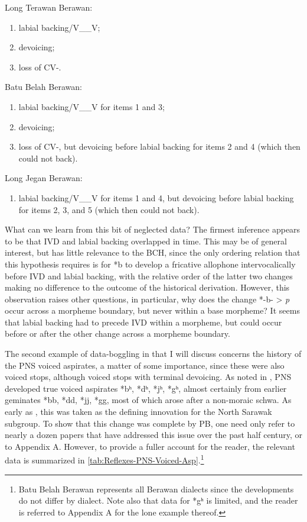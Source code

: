 \documentclass[output=paper]{langscibook}
\begin{document}
\ea
Long Terawan Berawan:
\begin{enumerate}
\item[(1)] labial backing/V\_\_V;
\item[(2)] devoicing;
\item[(3)] loss of CV-. 
\end{enumerate}
\z

\ea
Batu Belah Berawan:
\begin{enumerate}
\item[(1)] labial backing/V\_\_V for items 1 and 3;
\item[(2)] devoicing;
\item[(3)] loss of CV-, but devoicing before labial backing for items 2 and 4 (which then could not back).
\end{enumerate}
\z

\ea
Long Jegan Berawan:
\begin{enumerate}
\item[(1)] labial backing/V\_\_V for items 1 and 4, but  devoicing before labial backing for items 2, 3, and 5 (which then could not back).
\end{enumerate} 
\z

What can we learn from this bit of neglected data? The firmest inference appears to be that IVD and labial backing overlapped in time. This may be of general interest, but has little relevance to the BCH, since the only ordering relation that this hypothesis requires is for *b to develop a fricative allophone intervocalically before IVD and labial backing, with the relative order of the latter two changes making no difference to the outcome of the historical derivation. However, this observation raises other questions, in particular, why does the change *-b- > \textit{p} occur across a morpheme boundary, but never within a base morpheme? It seems that labial backing had to precede IVD within a morpheme, but could occur before or after the other change across a morpheme boundary.

The second example of data-boggling in \citet{Beguš2018} that I will discuss concerns the history of the PNS voiced aspirates, a matter of some importance, since these were also voiced stops, although voiced stops with terminal devoicing. As noted in \citet{Blust2006}, PNS developed true voiced aspirates *bʰ, *dʰ, *jʰ, *gʰ, almost certainly from earlier geminates *bb, *dd, *jj, *gg, most of which arose after a non-moraic schwa. As early as \citet{Blust1969}, this was taken as the defining innovation for the North Sarawak subgroup. To show that this change was complete by PB, one need only refer to nearly a dozen papers that have addressed this issue over the past half century, or to Appendix A.  However, to provide a fuller account for the reader, the relevant data is summarized in \cref{tab:Reflexes-PNS-Voiced-Asp}.\footnote{Batu Belah Berawan represents all Berawan dialects since the developments do not differ by dialect. Note also that data for *gʰ is limited, and the reader is referred to Appendix A for the lone example thereof.}
\end{document}
